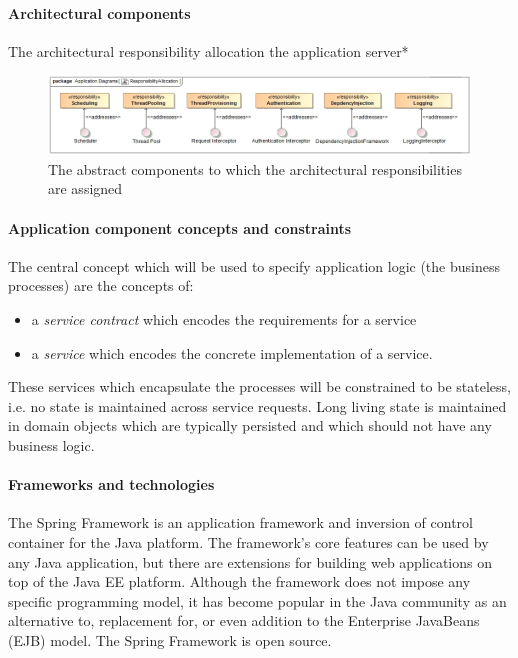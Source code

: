 \documentclass[a4paper,12pt]{report}
\begin{document}
			\paragraph {Architectural components}
			\hfill \break
				The architectural responsibility allocation the application server*			
				\begin{figure}[htb]
					\centering
					\includegraphics [scale=0.5]{../Diagrams/applicationServerResponsibiltiesAllocationZ.png}
					\caption{The abstract components to which the architectural responsibilities are assigned}
				\end{figure}
			
			\paragraph {Application component concepts and constraints}
			The central concept which will be used to specify application logic (the business processes) are the
			concepts of:
				\begin {itemize}
					\item a \textit{service contract} which encodes the requirements for a service
					\item a \textit{service} which encodes the concrete implementation of a service. 
				\end {itemize}
			These services which encapsulate the processes will be constrained to be stateless, i.e. no state
			is maintained across service requests.
			Long living state is maintained in domain objects which are typically persisted and which should
			not have any business logic.
			
			\paragraph {Frameworks and technologies}
			\hfill \break
			The Spring Framework is an application framework and inversion of control container for the Java platform. The framework's core features can be used by any Java application, but there are extensions for building web applications on top of the Java EE platform. Although the framework does not impose any specific programming model, it has become popular in the Java community as an alternative to, replacement for, or even addition to the Enterprise JavaBeans (EJB) model. The Spring Framework is open source.
			
\end{document}
